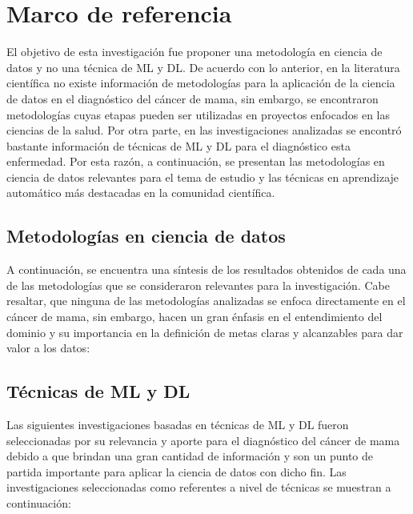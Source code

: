 \newpage
\section{Marco de referencia}
El objetivo de esta investigación fue proponer una metodología en ciencia de datos y no una técnica de ML y DL. De acuerdo con lo anterior, en la literatura científica no existe información de metodologías para la aplicación de la ciencia de datos en el diagnóstico del cáncer de mama, sin embargo, se encontraron metodologías cuyas etapas pueden ser utilizadas en proyectos enfocados en las ciencias de la salud. Por otra parte, en las investigaciones analizadas se encontró bastante información de técnicas de ML y DL para el diagnóstico esta enfermedad. Por esta razón, a continuación, se presentan las metodologías en ciencia de datos relevantes para el tema de estudio y las técnicas en aprendizaje automático más destacadas en la comunidad científica.  

\subsection{Metodologías en ciencia de datos}
A continuación, se encuentra una síntesis de los resultados obtenidos de cada una de las metodologías que se consideraron relevantes para la investigación. Cabe resaltar, que ninguna de las metodologías analizadas se enfoca directamente en el cáncer de mama, sin embargo, hacen un gran énfasis en el entendimiento del dominio y su importancia en la definición de metas claras y alcanzables para dar valor a los datos:


\newpage
\subsection{Técnicas de ML y DL}
Las siguientes investigaciones basadas en técnicas de ML y DL fueron seleccionadas por su relevancia y aporte para el diagnóstico del cáncer de mama debido a que brindan una gran cantidad de información y son un punto de partida importante para aplicar la ciencia de datos con dicho fin. Las investigaciones seleccionadas como referentes a nivel de técnicas se muestran a continuación:

